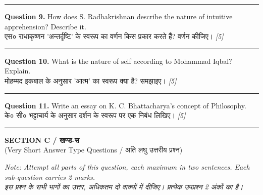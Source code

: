 \documentclass[11pt,a4paper]{article}
\newcommand{\pts}[1]{\hfill \textit{[#1]}}
\begin{document}
\medskip\rule{\linewidth}{0.2pt}\medskip

\noindent \textbf{Question 9.} How does S. Radhakrishnan describe the nature of intuitive apprehension? Describe it.\\[1pt]
एस० राधाकृष्णन 'अन्तर्दृष्टि' के स्वरूप का वर्णन किस प्रकार करते हैं? वर्णन कीजिए। \pts{5}

\medskip\rule{\linewidth}{0.2pt}\medskip

\noindent \textbf{Question 10.} What is the nature of self according to Mohammad Iqbal? Explain.\\[1pt]
मोहम्मद इकबाल के अनुसार 'आत्म' का स्वरूप क्या है? समझाइए। \pts{5}

\medskip\rule{\linewidth}{0.2pt}\medskip

\noindent \textbf{Question 11.} Write an essay on K. C. Bhattacharya's concept of Philosophy.\\[1pt]
के० सी० भट्टाचार्य के अनुसार दर्शन के स्वरूप पर एक निबंध लिखिए। \pts{5}

\bigskip
\rule{\linewidth}{0.2pt}
\bigskip

\begin{center}
  {\large\bfseries SECTION C / खण्ड-स}\\[2pt]
  {\normalsize (Very Short Answer Type Questions / अति लघु उत्तरीय प्रश्न)}
\end{center}

\noindent \textit{Note: Attempt all parts of this question, each maximum in two sentences. Each sub-question carries 2 marks.}\\[2pt]
\noindent \textit{इस प्रश्न के सभी भागों का उत्तर, अधिकतम दो वाक्यों में दीजिए। प्रत्येक उपप्रश्न 2 अंकों का है।}

\bigskip
\end{document}
